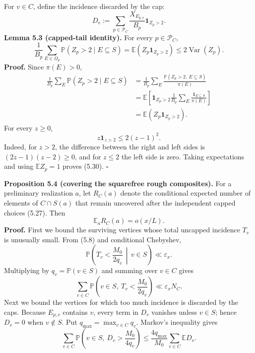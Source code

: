 \documentclass[10pt,letterpaper]{article}
\newcommand{\PP}{\mathbb{P}}
\newcommand{\EE}{\mathbb{E}}
\newcommand{\PC}{\mathcal{P}_C}
\newcommand{\ind}{\mathbf{1}}
\newcommand{\qedmark}{\(\square\)}
\DeclareMathOperator{\Var}{Var}
\begin{document}
For $v\in C$, define the incidence discarded by the cap:
\begin{equation}
D_v:=\sum_{p\in\PC}\frac{X_{E_{p,v}}}{B_p}\ind_{Z_p>2}.
\tag{5.29}
\end{equation}
\textbf{Lemma 5.3 (capped-tail identity).} For every $p\in\PC$,
\begin{equation}
\frac1{B_p}\sum_{E\in\Omega_p}\PP(Z_p>2\mid E\subseteq S)
=\EE(Z_p\ind_{Z_p>2})\le2\Var(Z_p).
\tag{5.30}
\end{equation}
\textbf{Proof.} Since $\pi(E)>0$,
\[
\begin{aligned}
\frac1{B_p}\sum_E\PP(Z_p>2\mid E\subseteq S)
&=\frac1{B_p}\sum_E\frac{\PP(Z_p>2,\ E\subseteq S)}{\pi(E)}\\
&=\EE\left[\ind_{Z_p>2}\frac1{B_p}\sum_E\frac{\ind_{E\subseteq S}}{\pi(E)}\right]\\
&=\EE(Z_p\ind_{Z_p>2}).
\end{aligned}
\]
For every $z\ge0$,
\[
z\ind_{z>2}\le2(z-1)^2.
\]
Indeed, for $z>2$, the difference between the right and left sides is $(2z-1)(z-2)\ge0$, and for $z\le2$ the left
side is zero. Taking expectations and using $\EE Z_p=1$ proves (5.30). \qedmark

\textbf{Proposition 5.4 (covering the squarefree rough composites).} For a preliminary realization $a$, let $R_C(a)$
denote the conditional expected number of elements of $C\cap S(a)$ that remain uncovered after the independent
capped choices (5.27). Then
\begin{equation}
\EE_aR_C(a)=o(x/L).
\tag{5.31}
\end{equation}
\textbf{Proof.} First we bound the surviving vertices whose total uncapped incidence $T_v$ is unusually small. From
(5.8) and conditional Chebyshev,
\[
\PP\left(T_v<\frac{M_0}{2q_v}\,\middle|\,v\in S\right)\ll\varepsilon_x.
\]
Multiplying by $q_v=\PP(v\in S)$ and summing over $v\in C$ gives
\begin{equation}
\sum_{v\in C}\PP\left(v\in S,\ T_v<\frac{M_0}{2q_v}\right)\ll\varepsilon_xN_C.
\tag{5.32}
\end{equation}
Next we bound the vertices for which too much incidence is discarded by the caps. Because $E_{p,v}$ contains $v$,
every term in $D_v$ vanishes unless $v\in S$; hence $D_v=0$ when $v\notin S$. Put $q_{\max}=\max_{v\in C}q_v$. Markov's inequality
gives
\begin{equation}
\sum_{v\in C}\PP\left(v\in S,\ D_v>\frac{M_0}{4q_v}\right)
\le\frac{4q_{\max}}{M_0}\sum_{v\in C}\EE D_v.
\tag{5.33}
\end{equation}
\end{document}
